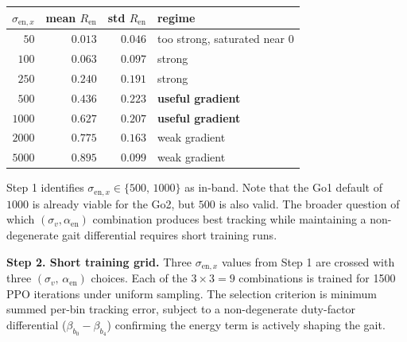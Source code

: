 \documentclass[a4paper,11pt]{article}
\begin{document}
    \begin{center}
    \begin{tabular}{@{}r r r l@{}}
    \toprule
    $\sigma_{\mathrm{en},x}$ & mean $R_{\mathrm{en}}$ & std $R_{\mathrm{en}}$ & regime \\
    \midrule
    $50$   & $0.013$ & $0.046$ & too strong, saturated near $0$ \\
    $100$  & $0.063$ & $0.097$ & strong \\
    $250$  & $0.240$ & $0.191$ & strong \\
    $500$  & $0.436$ & $0.223$ & \textbf{useful gradient} \\
    $1000$ & $0.627$ & $0.207$ & \textbf{useful gradient} \\
    $2000$ & $0.775$ & $0.163$ & weak gradient \\
    $5000$ & $0.895$ & $0.099$ & weak gradient \\
    \bottomrule
    \end{tabular}
    \label{tab:step1}
    \end{center}

    Step 1 identifies $\sigma_{\mathrm{en},x} \in \{500,\,1000\}$ as in-band. Note that the Go1 default of $1000$ is already viable for the Go2, but $500$ is also valid. The broader question of which $(\sigma_v, \alpha_{\mathrm{en}})$ combination produces best tracking while maintaining a non-degenerate gait differential requires short training runs.

    \textbf{Step 2. Short training grid.} Three $\sigma_{\mathrm{en},x}$ values from Step 1 are crossed with three $(\sigma_v,\,\alpha_{\mathrm{en}})$ choices. Each of the $3\times3=9$ combinations is trained for 1500 PPO iterations under uniform sampling. The selection criterion is minimum summed per-bin tracking error, subject to a non-degenerate duty-factor differential ($\beta_{b_0} - \beta_{b_4}$) confirming the energy term is actively shaping the gait.
\end{document}
